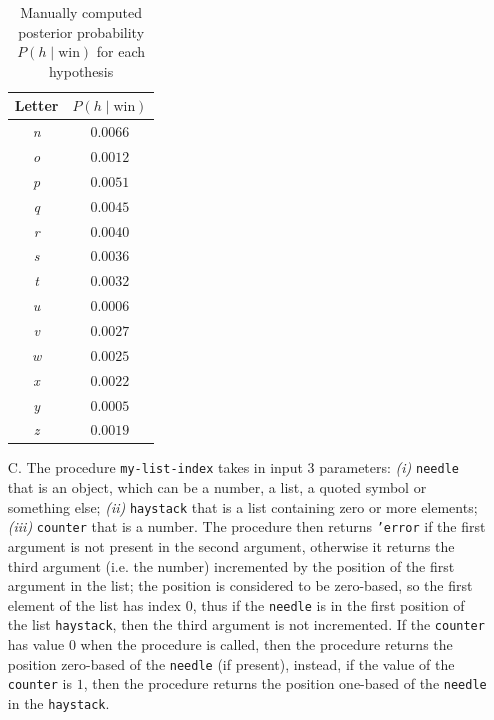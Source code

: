 \begin{itemize}
\begin{table}[H]
\begin{minipage}{.4\linewidth}
\begin{tabular}{c c}
                    \hline
                    \textbf{Letter} & $P(h\;|\;\text{win})$ \\
                    \hline
                    \textit{n} & $0.0066$ \\
                    \textit{o} & $0.0012$ \\
                    \textit{p} & $0.0051$ \\
                    \textit{q} & $0.0045$ \\
                    \textit{r} & $0.0040$ \\
                    \textit{s} & $0.0036$ \\
                    \textit{t} & $0.0032$ \\
                    \textit{u} & $0.0006$ \\
                    \textit{v} & $0.0027$ \\
                    \textit{w} & $0.0025$ \\
                    \textit{x} & $0.0022$ \\
                    \textit{y} & $0.0005$ \\
                    \textit{z} & $0.0019$ \\
                    \hline
                \end{tabular}
            \end{minipage}
            
            \caption{Manually computed posterior probability $P(h\;|\;\text{win})$ for each hypothesis}
            \label{tab:casino-game}
        \end{table}
    \item[C.] The procedure \texttt{my-list-index} takes in input 3 parameters: \textit{(i)} \texttt{needle} that is an object, 
        which can be a number, a list, a quoted symbol or something else; \textit{(ii)} \texttt{haystack} that is a list containing zero 
        or more elements; \textit{(iii)} \texttt{counter} that is a number. 
        The procedure then returns \texttt{'error} if the first argument is not present in the second argument, otherwise it returns the
        third argument (i.e. the number) incremented by the position of the first argument in the list; the position is considered to be
        zero-based, so the first element of the list has index $0$, thus if the \texttt{needle} is in the first position of the list 
        \texttt{haystack}, then the third argument is not incremented. If the \texttt{counter} has value $0$ when the procedure is 
        called, then the procedure returns the position zero-based of the \texttt{needle} (if present), instead, if the value of the
        \texttt{counter} is $1$, then the procedure returns the position one-based of the \texttt{needle} in the \texttt{haystack}.
    

\end{itemize}
